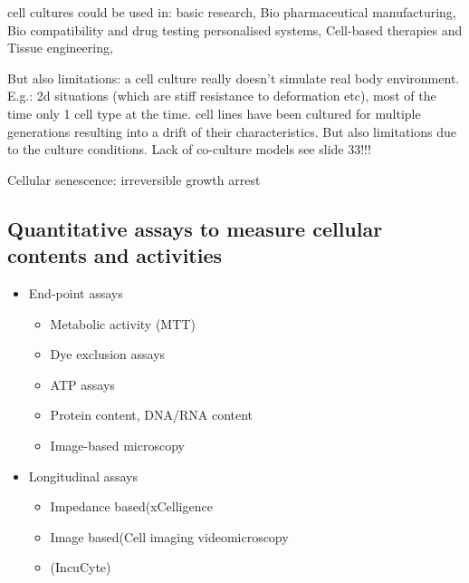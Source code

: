 \documentclass{article}
\begin{document}
cell cultures could be used in: basic research, Bio pharmaceutical manufacturing, Bio compatibility and drug testing personalised systems, Cell-based therapies and Tissue engineering, 

But also limitations: a cell culture really doesn't simulate real body environment. E.g.: 2d situations (which are stiff resistance to deformation etc), most of the time only 1 cell type at the time. cell lines have been cultured for multiple generations resulting into a drift of their characteristics.
But also limitations due to the culture conditions. Lack of co-culture models see slide 33!!!

Cellular senescence: irreversible growth arrest

\subsection{Quantitative assays to measure cellular contents and activities}

\begin{itemize}
    \item End-point assays
    \begin{itemize}
        \item Metabolic activity (MTT)
        \item Dye exclusion assays
        \item ATP assays
        \item Protein content, DNA/RNA content
        \item Image-based microscopy
    \end{itemize}
    \item Longitudinal assays
    \begin{itemize}
        \item Impedance based(xCelligence
        \item Image based(Cell imaging videomicroscopy
        \item (IncuCyte)
    \end{itemize}
\end{itemize}
\end{document}
